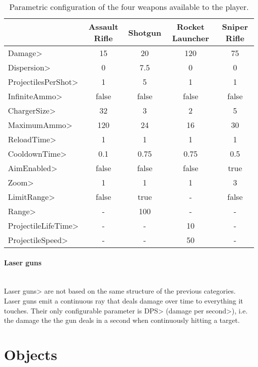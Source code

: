 \begin{table}[p]
\setlength\extrarowheight{2pt}
\begin{tabularx}{\textwidth}{|l|C|C|C|C|}
& Assault Rifle & Shotgun & Rocket Launcher & Sniper Rifle  \\
\hline
\<Damage> & 15  & 20  &  120 & 75  \\
\hline
\<Dispersion> & 0  & 7.5  & 0  & 0  \\
\hline
\<ProjectilesPerShot> &  1 &  5 & 1  & 1  \\
\hline
\<InfiniteAmmo> & false & false  & false &   false\\
\hline
\<ChargerSize> & 32  & 3  &  2 &  5 \\
\hline
\<MaximumAmmo> &  120 &  24 & 16  & 30  \\
\hline
\<ReloadTime> &  1 & 1  &  1 & 1  \\
\hline
\<CooldownTime> &  0.1 &  0.75 &  0.75 &  0.5 \\
\hline
\<AimEnabled> &  false & false  & false  & true  \\
\hline
\<Zoom> & 1  &  1 &  1 & 3  \\
\hline
\<LimitRange> & false  & true  &  - & false  \\
\hline
\<Range> &  - &  100 &  - &  - \\
\hline
\<ProjectileLifeTime> & -  & -  & 10  & -  \\
\hline
\<ProjectileSpeed> &  - &  - & 50 &  - \\
\hline
\end{tabularx}
\caption{Parametric configuration of the four weapons available to the player.}
    \label{tab:gunconfig}
\end{table}

\paragraph{Laser guns}

\mbox{}\\

{\setlength{\parindent}{0cm}
\<Laser guns> are not based on the same structure of the previous categories. Laser guns emit a continuous ray that deals damage over time to everything it touches. Their only configurable parameter is \<DPS> (\<damage per second>), i.e. the damage the the gun deals in a second when continuously hitting a target.
}


\section{Objects}


